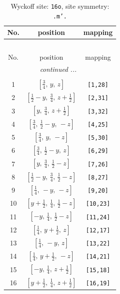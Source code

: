 \documentclass[fleqn,8pt]{jsarticle}
\begin{document}
\renewcommand{\arraystretch}{1.2}
\begin{longtable}{ccc}
\caption{Wyckoff site: {\tt 16o}, site symmetry: {\tt .m'.}}
 \\
 \hline \hline
No. & position & mapping \\ \hline \endfirsthead

\multicolumn{2}{l}{\tablename\ \thetable{}} \\
 \hline \hline
No. & position & mapping \\ \hline \endhead

 \hline \hline
\multicolumn{2}{r}{\footnotesize\it continued ...} \\ \endfoot

 \hline \hline
\multicolumn{2}{r}{} \\ \endlastfoot

1 & $\left[ \frac{3}{4},\, y,\, z \right]$ & {\tt [1,28]} \\ \hline
2 & $\left[ \frac{1}{2} - y,\, \frac{3}{4},\, z + \frac{1}{2} \right]$ & {\tt [2,31]} \\ \hline
3 & $\left[ y,\, \frac{3}{4},\, z + \frac{1}{2} \right]$ & {\tt [3,32]} \\ \hline
4 & $\left[ \frac{3}{4},\, \frac{1}{2} - y,\, - z \right]$ & {\tt [4,25]} \\ \hline
5 & $\left[ \frac{3}{4},\, y,\, - z \right]$ & {\tt [5,30]} \\ \hline
6 & $\left[ \frac{3}{4},\, \frac{1}{2} - y,\, z \right]$ & {\tt [6,29]} \\ \hline
7 & $\left[ y,\, \frac{3}{4},\, \frac{1}{2} - z \right]$ & {\tt [7,26]} \\ \hline
8 & $\left[ \frac{1}{2} - y,\, \frac{3}{4},\, \frac{1}{2} - z \right]$ & {\tt [8,27]} \\ \hline
9 & $\left[ \frac{1}{4},\, - y,\, - z \right]$ & {\tt [9,20]} \\ \hline
10 & $\left[ y + \frac{1}{2},\, \frac{1}{4},\, \frac{1}{2} - z \right]$ & {\tt [10,23]} \\ \hline
11 & $\left[ - y,\, \frac{1}{4},\, \frac{1}{2} - z \right]$ & {\tt [11,24]} \\ \hline
12 & $\left[ \frac{1}{4},\, y + \frac{1}{2},\, z \right]$ & {\tt [12,17]} \\ \hline
13 & $\left[ \frac{1}{4},\, - y,\, z \right]$ & {\tt [13,22]} \\ \hline
14 & $\left[ \frac{1}{4},\, y + \frac{1}{2},\, - z \right]$ & {\tt [14,21]} \\ \hline
15 & $\left[ - y,\, \frac{1}{4},\, z + \frac{1}{2} \right]$ & {\tt [15,18]} \\ \hline
16 & $\left[ y + \frac{1}{2},\, \frac{1}{4},\, z + \frac{1}{2} \right]$ & {\tt [16,19]} \\
\end{longtable}
\end{document}
